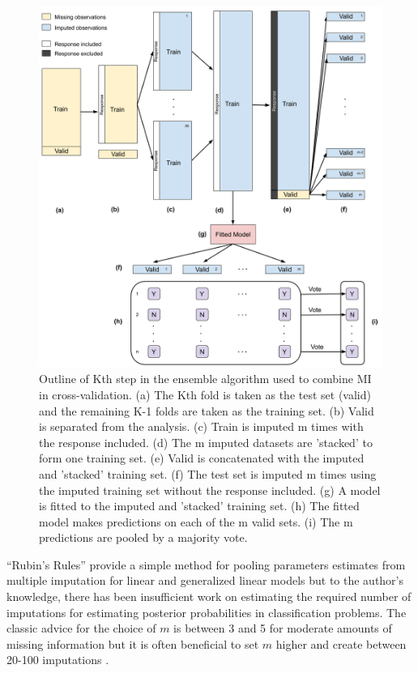 \documentclass[12pt,]{article}
\begin{document}
\begin{figure}[H]

{\centering \includegraphics[width=1\linewidth]{images/ensemble-imputation} 

}

\caption{\label{fig:ensemble-imputation}Outline of Kth step in the ensemble algorithm used to combine MI in cross-validation.  (a) The Kth fold is taken as the test set (valid) and the remaining K-1 folds are taken as the training set. (b) Valid is separated from the analysis. (c) Train is imputed m times with the response included. (d) The m imputed datasets are 'stacked' to form one training set.  (e) Valid is concatenated with the imputed and 'stacked' training set.  (f) The test set is imputed m times using the imputed training set without the response included.  (g) A model is fitted to the imputed and 'stacked' training set.  (h) The fitted model makes predictions on each of the m valid sets.  (i) The m predictions are pooled by a majority vote.}\label{fig:unnamed-chunk-2}
\end{figure}

``Rubin's Rules'' \autocite{rubin_inference_1976} provide a simple
method for pooling parameters estimates from multiple imputation for
linear and generalized linear models but to the author's knowledge,
there has been insufficient work on estimating the required number of
imputations for estimating posterior probabilities in classification
problems. The classic advice for the choice of \(m\) is between 3 and 5
for moderate amounts of missing information but it is often beneficial
to set \(m\) higher and create between 20-100 imputations
\autocite[pp.112-113]{van_buuren_flexible_2012}.
\end{document}
